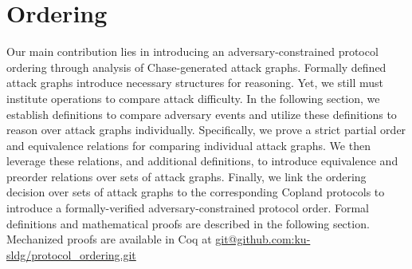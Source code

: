 \documentclass[runningheads]{llncs}
\theoremstyle{definition}
\newcommand{\squash}{\itemsep=0pt\parskip=0pt}
\begin{document}



\section{Ordering}

Our main contribution lies in introducing an adversary-constrained protocol ordering through analysis of Chase-generated attack graphs. Formally defined attack graphs introduce necessary structures for reasoning. Yet, we still must institute operations to compare attack difficulty. In the following section, we establish definitions to compare adversary events and utilize these definitions to reason over attack graphs individually. Specifically, we prove a strict partial order and equivalence relations for comparing individual attack graphs. We then leverage these relations, and additional definitions, to introduce equivalence and preorder relations over sets of attack graphs. Finally, we link the ordering decision over sets of attack graphs to the corresponding Copland protocols to introduce a formally-verified adversary-constrained protocol order. Formal definitions and mathematical proofs are described in the following section. Mechanized proofs are available in Coq at \url{git@github.com:ku-sldg/protocol_ordering.git}
\end{document}
